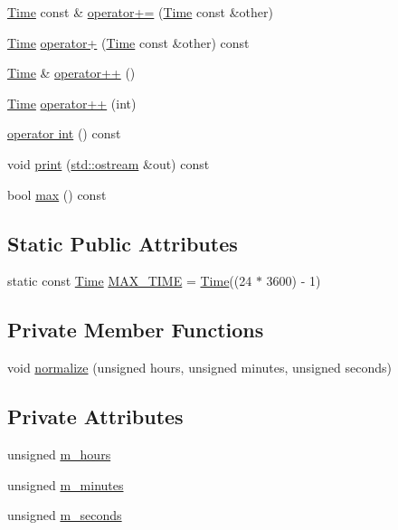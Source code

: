 \begin{DoxyCompactItemize}
\item 
\hyperlink{classTime}{Time} const  \& \hyperlink{classTime_a54a1d73b40abf9578a5d324d2805fdce}{operator+=} (\hyperlink{classTime}{Time} const \&other)
\item 
\hyperlink{classTime}{Time} \hyperlink{classTime_ace5e47a96c86c077b4e42b6713ae70de}{operator+} (\hyperlink{classTime}{Time} const \&other) const
\item 
\hyperlink{classTime}{Time} \& \hyperlink{classTime_a55e7ec82d5f390aa1896084e25a0f5a5}{operator++} ()
\item 
\hyperlink{classTime}{Time} \hyperlink{classTime_a9d672dbfc01b4d7f7d5789640017dc37}{operator++} (int)
\item 
\hyperlink{classTime_a7bc1d44c446e70740ab3f0dd64e457be}{operator int} () const
\item 
void \hyperlink{classTime_a2596ef53ebb188dc75b88160bd0aa230}{print} (\hyperlink{doctest_8h_a116af65cb5e924b33ad9d9ecd7a783f3}{std\+::ostream} \&out) const
\item 
bool \hyperlink{classTime_a57f85c6b8295acdcf4e2f22ce7685170}{max} () const
\end{DoxyCompactItemize}
\subsection*{Static Public Attributes}
\begin{DoxyCompactItemize}
\item 
static const \hyperlink{classTime}{Time} \hyperlink{classTime_aeb625f84f2755479deac3ca3fd1d1cb4}{M\+A\+X\+\_\+\+T\+I\+ME} = \hyperlink{classTime}{Time}((24 $\ast$ 3600) -\/ 1)
\end{DoxyCompactItemize}
\subsection*{Private Member Functions}
\begin{DoxyCompactItemize}
\item 
void \hyperlink{classTime_a28eac7fba803ce12a29fdc565c37842c}{normalize} (unsigned hours, unsigned minutes, unsigned seconds)
\end{DoxyCompactItemize}
\subsection*{Private Attributes}
\begin{DoxyCompactItemize}
\item 
unsigned \hyperlink{classTime_a75b303219e28be4ef13dfb64e9a715b1}{m\+\_\+hours}
\item 
unsigned \hyperlink{classTime_abbae8355faea249a8777bf9b26f470fd}{m\+\_\+minutes}
\item 
unsigned \hyperlink{classTime_a068bd6e2a832b8eba85c5291b6321494}{m\+\_\+seconds}
\end{DoxyCompactItemize}
